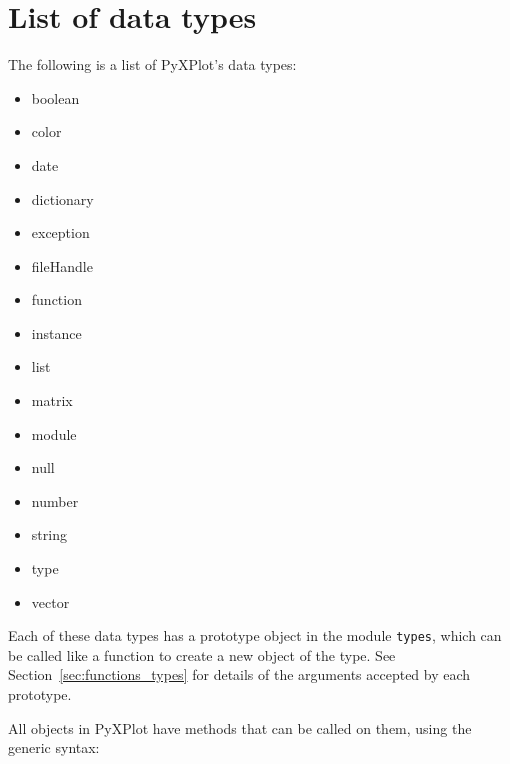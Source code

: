 %
%
%
%
%



\chapter{List of data types}
\label{ch:types_list}

The following is a list of PyXPlot's data types:

\begin{itemize}
\item boolean
\item color
\item date
\item dictionary
\item exception
\item fileHandle
\item function
\item instance
\item list
\item matrix
\item module
\item null
\item number
\item string
\item type
\item vector
\end{itemize}

Each of these data types has a prototype object in the module {\tt types},
which can be called like a function to create a new object of the type. See
Section~\ref{sec:functions_types} for details of the arguments accepted by each
prototype.

All objects in PyXPlot have methods that can be called on them, using the generic syntax:


